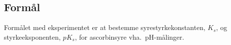 \subsection*{Formål}
Formålet med eksperimentet er at bestemme syrestyrkekonstanten,
$K_s$, og styrkeeksponenten, $pK_s$, for ascorbinsyre vha.~pH-målinger.